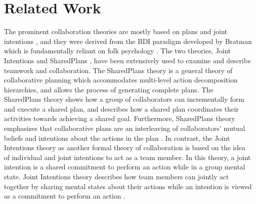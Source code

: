 \section{Related Work}
\label{sec:related-work}

The prominent collaboration theories are mostly based on plans and joint
intentions \cite{cohen:teamwork,grosz:plans-discourse}, and they were derived
from the BDI paradigm developed by Bratman \cite{bratman:intentions-plans} which
is fundamentally reliant on folk psychology \cite{ravenscroft:folk}. The two
theories, Joint Intentions \cite{cohen:teamwork} and SharedPlans
\cite{grosz:plans-discourse}, have been extensively used to examine and describe
teamwork and collaboration. The SharedPlans theory is a general theory of
collaborative planning which accommodates multi-level action decomposition
hierarchies, and allows the process of generating complete plans. The
SharedPlans theory shows how a group of collaborators can incrementally form and
execute a shared plan, and describes how a shared plan coordinates their
activities towards achieving a shared goal. Furthermore, SharedPlans theory
emphasizes that collaborative plans are an interleaving of collaborators' mutual
beliefs and intentions about the actions in the plan
\cite{grosz:planning-acting,grosz:collaboration,grosz:plans-discourse}. In
contrast, the Joint Intentions theory as another formal theory of collaboration
is based on the idea of individual and joint intentions to act as a team member.
In this theory, a joint intention is a shared commitment to perform an action
while in a group mental state. Joint Intentions theory describes how team
members can jointly act together by sharing mental states about their actions
while an intention is viewed as a commitment to perform an action
\cite{cohen:teamwork}.

